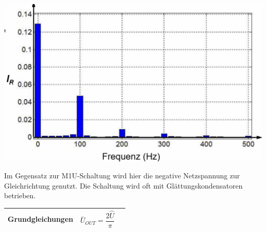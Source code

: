 \begin{minipage}{0.35\linewidth}
    \includegraphics[width=\linewidth]{images/UGB2OW}
\end{minipage}\newline

Im Gegensatz zur M1U-Schaltung wird hier die negative Netzspannung zur Gleichrichtung genutzt.\newline
Die Schaltung wird oft mit Glättungskondensatoren betrieben.
\begin{longtable}{| p{} | p{} | p{} |} 
    \hline
    \textbf{Grundgleichungen}&
    \[ \bar{U}_{OUT} = \dfrac{2\widehat{U}}{\pi}\]&\\
    \hline   
\end{longtable}
